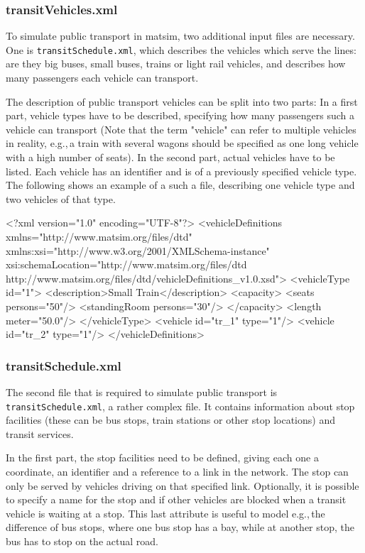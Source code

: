 \subsubsection{transitVehicles.xml}
To simulate public transport in \gls{matsim}, two additional input files are necessary. One is \lstinline|transitSchedule.xml|, which describes the vehicles which serve the lines: are they big buses, small buses, trains or light rail vehicles, and describes how many passengers each vehicle can transport.

The description of public transport vehicles can be split into two parts: In a first part, vehicle types have to be described, specifying how many passengers such a vehicle can transport (Note that the term "vehicle" can refer to multiple vehicles in reality, e.g.,\,a train with several wagons should be specified as one long vehicle with a high number of seats). In the second part, actual vehicles have to be listed. Each vehicle has an identifier and is of a previously specified vehicle type. The following shows an example of a such a file, describing one vehicle type and two vehicles of that type. 

\begin{xml}
<?xml version="1.0" encoding="UTF-8"?> 
<vehicleDefinitions xmlns="http://www.matsim.org/files/dtd" 
       xmlns:xsi="http://www.w3.org/2001/XMLSchema-instance" 
       xsi:schemaLocation="http://www.matsim.org/files/dtd 
                     http://www.matsim.org/files/dtd/vehicleDefinitions_v1.0.xsd"> 
	<vehicleType id="1"> 
      <description>Small Train</description> 
      <capacity> 
         <seats persons="50"/> 
         <standingRoom persons="30"/> 
      </capacity> 
      <length meter="50.0"/> 
   </vehicleType> 
   <vehicle id="tr_1" type="1"/> 
   <vehicle id="tr_2" type="1"/> 
</vehicleDefinitions>
\end{xml}

\subsubsection{transitSchedule.xml}
The second file that is required to simulate public transport is \lstinline|transitSchedule.xml|, a rather complex file. It contains information about stop facilities (these can be bus stops, train stations or other stop locations) and transit services.

In the first part, the stop facilities need to be defined, giving each one a coordinate, an identifier and a reference to a link in the network. The stop can only be served by vehicles driving on that specified link. Optionally, it is possible to specify a name for the stop and if other vehicles are blocked when a transit vehicle is waiting at a stop. This last attribute is useful to model e.g.,\,the difference of bus stops, where one bus stop has a bay, while at another stop, the bus has to stop on the actual road.

